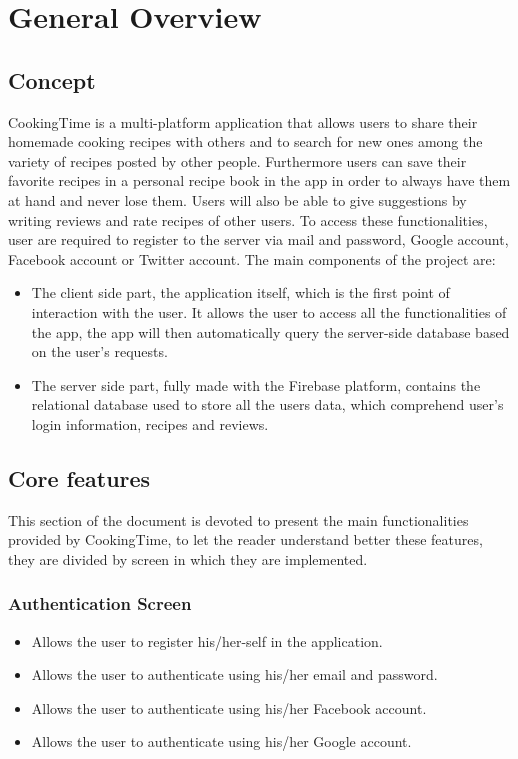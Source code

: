 \chapter{General Overview}

\section{Concept}
	CookingTime is a multi-platform application that allows users to share their homemade cooking recipes with others and to search for new ones among the variety of recipes posted by other people.
	Furthermore users can save their favorite recipes in a personal recipe book in the app in order to always have them at hand and never lose them.
	Users will also be able to give suggestions by writing reviews and rate recipes of other users.
	To access these functionalities, user are required to register to the server via mail and password, Google account, Facebook account or Twitter account.
	The main components of the project are:
	\begin{itemize}
		\item The client side part, the application itself, which is the first point of interaction with the user.
		It allows the user to access all the functionalities of the app, the app will then automatically query the server-side database based on the user's requests.
		
		\item The server side part, fully made with the Firebase platform, contains the relational database used to store all the users data, which comprehend user's login information, recipes and reviews.
	\end{itemize}


\section{Core features}
	This section of the document is devoted to present the main functionalities provided by CookingTime, to let the reader understand better these features, 
	they are divided by screen in which they are implemented.
	
	\subsection{Authentication Screen}
		\begin{itemize}
			\item Allows the user to register his/her-self in the application.
		
			\item Allows the user to authenticate using his/her email and password.
			
			\item Allows the user to authenticate using his/her Facebook account.
			
			\item Allows the user to authenticate using his/her Google account.
		\end{itemize}

